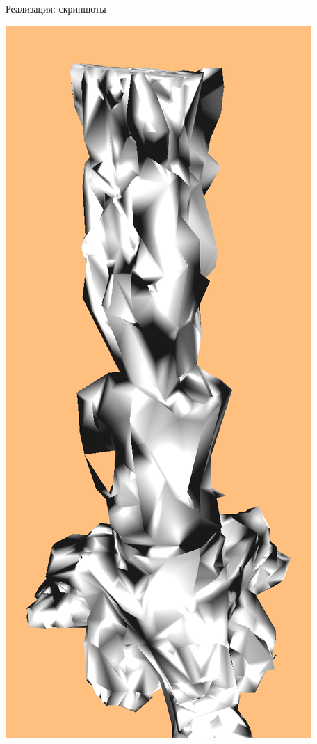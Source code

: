 \begin{frame}{Реализация: скриншоты}
\begin{center}
        \includegraphics[width=.2\textwidth]{pics/demo-cut-3.png}
    \end{center}
\end{frame}
